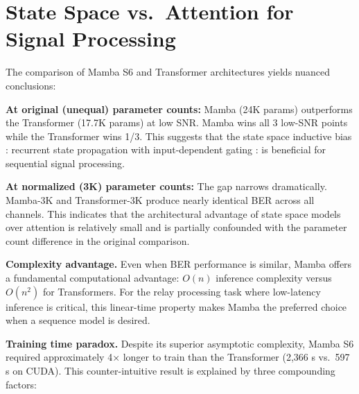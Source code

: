 \section{State Space vs.~Attention for Signal Processing}\label{sec:state-space-vs.-attention-for-signal-processing}

The comparison of Mamba S6 and Transformer architectures yields nuanced conclusions:

\textbf{At original (unequal) parameter counts:} Mamba (24K params) outperforms the Transformer (17.7K params) at low SNR. Mamba wins all 3 low-SNR points while the Transformer wins 1/3. This suggests that the state space inductive bias : recurrent state propagation with input-dependent gating : is beneficial for sequential signal processing.

\textbf{At normalized (3K) parameter counts:} The gap narrows dramatically. Mamba-3K and Transformer-3K produce nearly identical BER across all channels. This indicates that the architectural advantage of state space models over attention is relatively small and is partially confounded with the parameter count difference in the original comparison.

\textbf{Complexity advantage.} Even when BER performance is similar, Mamba offers a fundamental computational advantage: \(O(n)\) inference complexity versus \(O(n^2)\) for Transformers. For the relay processing task where low-latency inference is critical, this linear-time property makes Mamba the preferred choice when a sequence model is desired.

\textbf{Training time paradox.} Despite its superior asymptotic complexity, Mamba S6 required approximately 4× longer to train than the Transformer (2,366 s vs.~597 s on CUDA). This counter-intuitive result is explained by three compounding factors:

